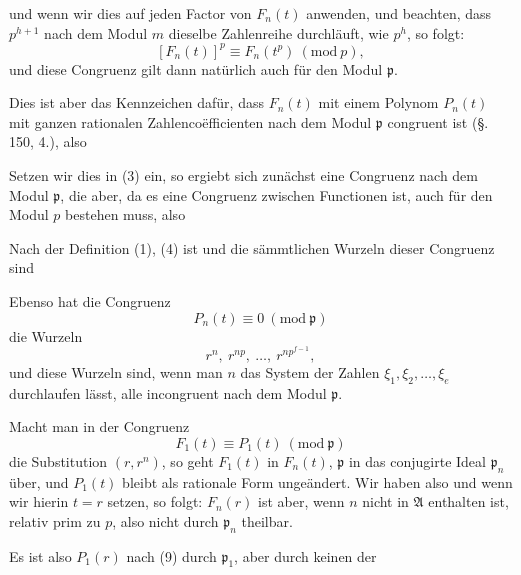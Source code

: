 und wenn wir dies auf jeden Factor von $F_n(t)$ anwenden, und
beachten, dass $p^{h+1}$ nach dem Modul $m$ dieselbe Zahlenreihe
durchläuft, wie $p^h$, so folgt:
\[
[F_n(t)]^p \equiv F_n(t^p) \ (\mathrm{mod}\ p),
\]
und diese Congruenz gilt dann natürlich auch für den Modul $\mathfrak p$.

Dies ist aber das Kennzeichen dafür, dass $F_n(t)$ mit einem
Polynom $P_n(t)$ mit ganzen rationalen Zahlenco\"efficienten nach
dem Modul $\mathfrak p$ congruent ist (\S.\,150, 4.), also

Setzen wir dies in (3) ein, so ergiebt sich zunächst eine
Congruenz nach dem Modul $\mathfrak p$, die aber, da es eine Congruenz
zwischen  Functionen ist, auch für den Modul $p$
bestehen muss, also

Nach der Definition (1), (4) ist
und die sämmtlichen Wurzeln dieser Congruenz sind

Ebenso hat die Congruenz
\[
P_n(t) \equiv 0 \ (\mathrm{mod}\ \mathfrak p)
\]
die Wurzeln
\[
r^n,\ r^{np},\ \ldots,\ r^{np^{f-1}},
\]
und diese Wurzeln sind, wenn man $n$ das System der Zahlen
$\xi_1, \xi_2, \ldots, \xi_e$ durchlaufen lässt, alle incongruent nach dem
Modul $\mathfrak p$.

Macht man in der Congruenz
\[
F_1(t) \equiv P_1(t) \ (\mathrm{mod}\ \mathfrak p)
\]
die Substitution $(r, r^n)$, so geht $F_1(t)$ in $F_n(t)$, $\mathfrak p$ in das
conjugirte Ideal $\mathfrak p_n$ über, und $P_1(t)$ bleibt als rationale Form
ungeändert. Wir haben also
und wenn wir hierin $t=r$ setzen, so folgt:
$F_n(r)$ ist aber, wenn $n$ nicht in $\mathfrak A$ enthalten ist, relativ prim
zu $p$, also nicht durch $\mathfrak p_n$ theilbar.

Es ist also $P_1(r)$ nach (9) durch $\mathfrak p_1$, aber durch keinen der
